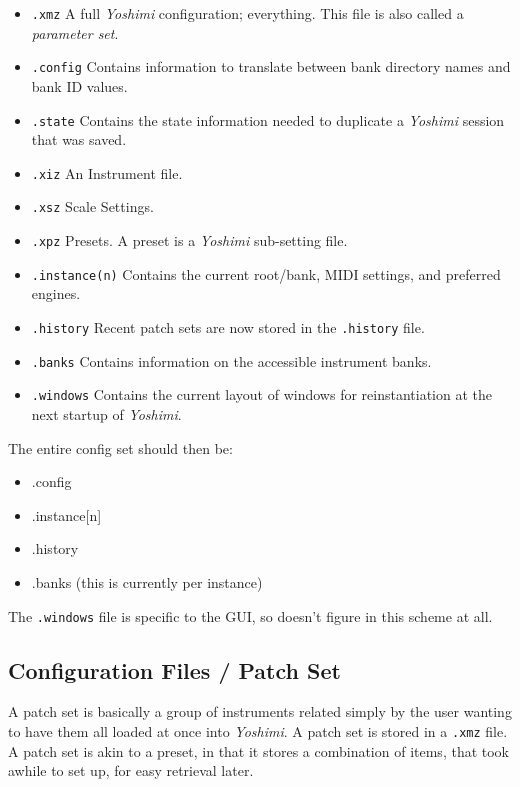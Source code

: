    \begin{itemize}
      \item \texttt{.xmz}
         A full \textsl{Yoshimi} configuration; everything.
         This file is also called a \textsl{parameter set}.
      \item \texttt{.config}
         Contains information to translate between bank directory names and
         bank ID values.
      \item \texttt{.state}
         Contains the state information needed to
         duplicate a \textsl{Yoshimi} session that was saved.
      \item \texttt{.xiz}
         An Instrument file.
      \item \texttt{.xsz}
         Scale Settings.
      \item \texttt{.xpz}
         Presets.
         A preset is a \textsl{Yoshimi} sub-setting file.
      \item \texttt{.instance(n)}
         Contains the current root/bank, MIDI settings, and preferred engines.
      \item \texttt{.history}
         Recent patch sets are now stored in the \texttt{.history} file.
      \item \texttt{.banks}
         Contains information on the accessible instrument banks.
      \item \texttt{.windows}
         Contains the current layout of windows for reinstantiation at the next
         startup of \textsl{Yoshimi}.
   \end{itemize}

   The entire config set should then be:

   \begin{itemize}
      \item .config
      \item .instance[n]
      \item .history
      \item .banks (this is currently per instance)
   \end{itemize}

   The \texttt{.windows} file is specific to the GUI, so doesn't figure in this
   scheme at all.

\subsection{Configuration Files / Patch Set}
\label{subsec:configuration_patch_set}

   A patch set is basically a group of instruments related simply by the user
   wanting to have them all loaded at once into \textsl{Yoshimi}.  A patch set
   is stored in a \texttt{.xmz} file.  A patch set is akin to a preset, in that
   it stores a combination of items, that took awhile to set up, for easy
   retrieval later.

